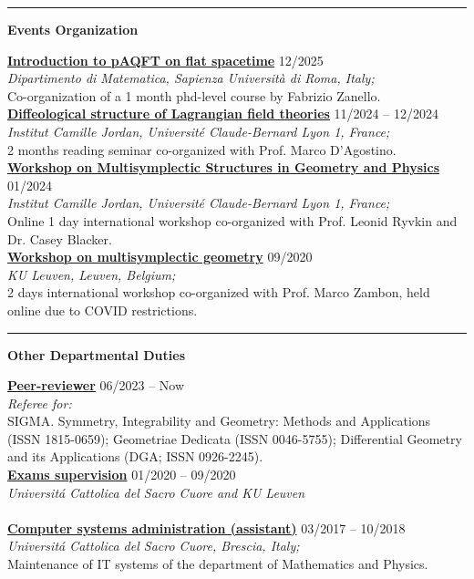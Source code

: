 \documentclass[a4paper]{article}
\newcommand{\block}[1]{\hrule \vspace{0.2cm} \textbf{\Large #1} \vspace{0.2cm}}
\newcommand{\voice}[5]{\href{#4}{\textbf{#1}} \hfill #2 \\ \textit{#3} \\ {\small #5} \vspace{0.2cm} \\}
\begin{document}


    \block{Events Organization}

    
    \voice{Introduction to pAQFT on flat spacetime}
        {12/2025}
        {Dipartimento di Matematica, Sapienza Università di Roma, Italy;}
        {https://www.antoniomiti.it/teaching/aqft-2025/}       
        {Co-organization of a 1 month phd-level course by Fabrizio Zanello.}
    \voice{Diffeological structure of Lagrangian field theories}
        {11/2024 -- 12/2024}
        {Institut Camille Jordan, Université Claude-Bernard Lyon 1, France;}
        {https://www.antoniomiti.it/teaching/LFT-2024/}       
        {2 months reading seminar co-organized with Prof. Marco D'Agostino.}
    \voice{Workshop on Multisymplectic Structures in Geometry and Physics}
        {01/2024}
        {Institut Camille Jordan, Université Claude-Bernard Lyon 1, France;}
        {https://math.gmu.edu/~cblacke/lyon.html}       
        {Online 1 day international workshop co-organized with Prof. Leonid Ryvkin and Dr. Casey Blacker.}
    \voice{Workshop on multisymplectic geometry}
        {09/2020}
        {KU Leuven, Leuven, Belgium;}
        {https://wis.kuleuven.be/events/multisymplectic}       
        {2 days international workshop co-organized with Prof. Marco Zambon, held online due to COVID restrictions.}





    \block{Other Departmental Duties}

    
    \voice{Peer-reviewer}
        {06/2023 -- Now}
        {Referee for:}
        {}       
        {SIGMA. Symmetry, Integrability and Geometry: Methods and Applications (ISSN 1815-0659); Geometriae Dedicata (ISSN 0046-5755); Differential Geometry and its Applications (DGA; ISSN 0926-2245).}
    \voice{Exams supervision}
        {01/2020 -- 09/2020}
        {Universit\'a Cattolica del Sacro Cuore and KU Leuven}
        {}       
        {\vspace{-0.5cm}}
    \voice{Computer systems administration (assistant)}
        {03/2017 -- 10/2018}
        {Universit\'a Cattolica del Sacro Cuore, Brescia, Italy;}
        {https://dipartimenti.unicatt.it/dmf-home}       
        {Maintenance of IT systems of the department of Mathematics and Physics.}
\end{document}
